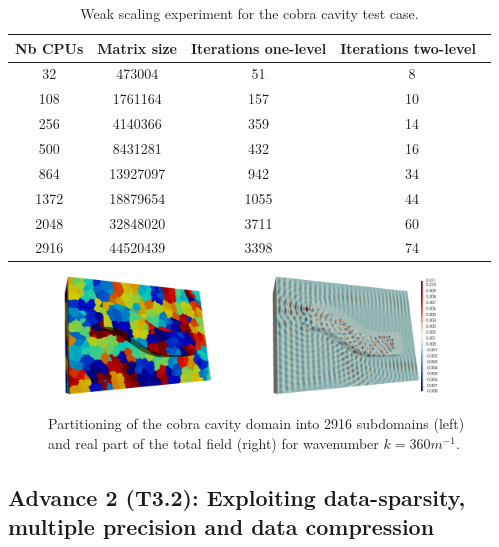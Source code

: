 \begin{table}[H]
    \scriptsize
\begin{center}
\begin{tabular}{cccc}
Nb CPUs & Matrix size & Iterations one-level & Iterations two-level~\cite{nataf:hal-04536547} \\
\hline
32 & 473004   & 51   &  8 \\
108 & 1761164  & 157  & 10 \\
256 & 4140366  & 359  & 14 \\
500 & 8431281  & 432  & 16 \\
864 & 13927097 & 942  & 34 \\
1372 & 18879654 & 1055 & 44 \\
2048 & 32848020 & 3711 & 60 \\
2916 & 44520439 & 3398 & 74 \\
\end{tabular}
\end{center}
    \caption{
		Weak scaling experiment for the cobra cavity test case.
    }\label{tab:weak_scaling_cobra}
\end{table}
\begin{figure}[H]
    \centering
	{\includegraphics[width=0.48\textwidth,clip=true,trim=7cm 0cm 7cm 0cm]{./graphics/wp3/cobra_mesh_2.png}}
	{\includegraphics[width=0.48\textwidth,clip=true,trim=7cm 0cm 7cm 0cm]{./graphics/wp3/cobra_real.png}}
	\caption{
		Partitioning of the cobra cavity domain into 2916 subdomains (left) and real part of the total field (right) for wavenumber $k = 360m^{-1}$. 
    }\label{fig:solutions_cobra}
\end{figure}

 \subsection{  Advance 2 (T3.2): Exploiting data-sparsity, multiple precision and data compression}

